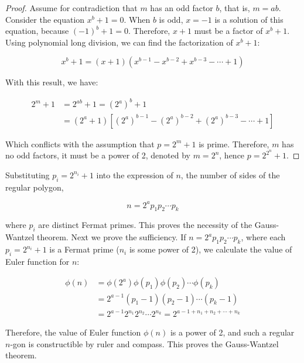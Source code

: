\begin{proof}
Assume for contradiction that $m$ has an odd factor $b$, that is, $m = ab$. Consider the equation $x^b + 1 = 0$. When $b$ is odd, $x = -1$ is a solution of this equation, because $(-1)^b + 1 = 0$. Therefore, $x + 1$ must be a factor of $x^b + 1$. Using polynomial long division, we can find the factorization of $x^b + 1$:

\[
x^b + 1 = (x + 1)(x^{b-1} - x^{b-2} + x^{b-3} - \dotsb + 1)
\]

With this result, we have:

\begin{align*}
2^m + 1 &= 2^{ab} + 1 = (2^a)^b + 1 \\
  &= (2^a + 1)[(2^a)^{b-1} - (2^a)^{b-2} + (2^a)^{b-3} - \dotsb + 1]
\end{align*}

Which conflicts with the assumption that $p = 2^m + 1$ is prime. Therefore, $m$ has no odd factors, it must be a power of 2, denoted by $m = 2^n$, hence $p = 2^{2^n} + 1$.
\end{proof}

Substituting $p_i = 2^{n_i} + 1$ into the expression of $n$, the number of sides of the regular polygon,

\[
n = 2^a p_1 p_2 \dotsm p_k
\]

where $p_i$ are distinct Fermat primes. This proves the necessity of the Gauss-Wantzel theorem. Next we prove the sufficiency. If $n = 2^a p_1 p_2 \dotsm p_k$, where each $p_i = 2^{n_i} + 1$ is a Fermat prime ($n_i$ is some power of 2), we calculate the value of Euler function for $n$:

\begin{align*}
\phi(n) &= \phi(2^a) \phi(p_1) \phi(p_2) \dotsm \phi(p_k)  \\
   &= 2^{a - 1} (p_1 - 1) (p_2 - 1) \dotsm (p_k - 1) \\
   &= 2^{a-1} 2^{n_1} 2^{n_2} \dotsm 2^{n_k} = 2^{a - 1 + n_1 + n_2 + \dotsb + n_k}
\end{align*}

Therefore, the value of Euler function $\phi(n)$ is a power of 2, and such a regular $n$-gon is constructible by ruler and compass. This proves the Gauss-Wantzel theorem.

